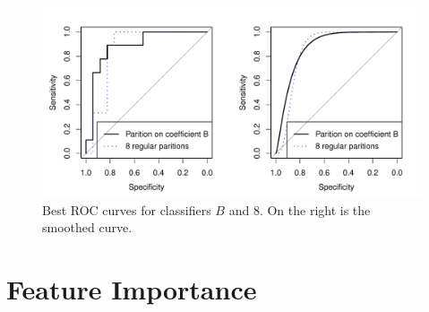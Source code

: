 \begin{figure}[!htbp]
  \begin{center}
  \includegraphics[width = \textwidth, keepaspectratio]{./figs/eegroc-comb.pdf}
  \end{center}
  \caption{Best ROC curves for classifiers $B$ and $8$. On the right is the smoothed curve.}
\end{figure}
\label{fig:eegroc} 




\section{Feature Importance}



